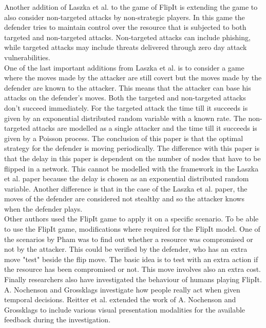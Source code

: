 Another addition of Laszka et al. to the game of FlipIt \cite{MitigationCovert} 
is extending the game to also consider non-targeted attacks by non-strategic players. In this game the defender tries to maintain control over the resource that is subjected to both targeted and non-targeted attacks. Non-targeted attacks can include phishing, while targeted attacks may include threats delivered through zero day attack vulnerabilities. \\
One of the last important additions from Laszka et al. \cite{MitigationNonTargeted} is to consider a game where the moves made by the attacker are still covert but the moves made by the defender are known to the attacker. This means that the attacker can base his attacks on the defender's moves. Both the targeted and non-targeted attacks don't succeed immediately. For the targeted attack the time till it succeeds is given by an exponential distributed random variable with a known rate. The non-targeted attacks are modelled as a single attacker and the time till it succeeds is given by a Poisson process. The conclusion of this paper is that the optimal strategy for the defender is moving periodically. The difference with this paper is that the delay in this paper is dependent on the number of nodes that have to be flipped in a network. This cannot be modelled with the framework in the Laszka et al. paper because the delay is chosen as an exponential distributed random variable. Another difference is that in the case of the Laszka et al. paper, the moves of the defender are considered not stealthy and so the attacker knows when the defender plays. \\ 

Other authors used the FlipIt game to apply it on a specific scenario. To be able to use the FlipIt game, modifications where required for the FlipIt model.
One of the scenarios by Pham \cite{compromised} was to find out whether a resource was compromised or not by the attacker. This could be verified by the defender, who has an extra move "test" beside the flip move. The basic idea is to test with an extra action if the resource has been compromised or not. This move involves also an extra cost.\\

Finally researchers also have investigated the behaviour of humans playing FlipIt. A. Nochenson and Grossklags \cite{nochenson2013behavioral}  investigate how people really act when given temporal decisions. Reitter et al. \cite{reitter2013risk} extended the work of A. Nochenson and Grossklags to include various visual presentation modalities for the available feedback during the investigation.




